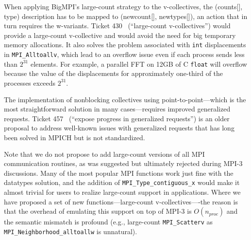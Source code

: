 When applying BigMPI's large-count strategy to the v-collectives, the (counts[], type) description 
has to be mapped to (newcount[], newtypes[]), an action that  in turn requires the w-variants.
Ticket 430~\cite{ticket430}
(``large-count v-collectives'') 
would provide a large-count v-collective and would avoid the need for big temporary memory allocations.
It also solves the problem associated with \texttt{int} displacements in \texttt{MPI\_Alltoallv}, which lead to
an overflow issue even if each process sends less than $2^{31}$ elements.
For example, a parallel FFT on 12GB of C \texttt{float} will overflow because the value of the displacements
for approximately one-third of the processes exceeds $2^{31}$.

The implementation of nonblocking collectives using
point-to-point---which is the most straightforward solution in many
cases---requires improved generalized requests.
Ticket 457~\cite{ticket457} %
(``expose progress in generalized requests'') is an older proposal to address well-known
issues with generalized requests that has long been solved in MPICH but is not standardized.


Note that we do not propose to add large-count versions of all MPI communication routines,
as was suggested but ultimately rejected during MPI-3 discussions.
Many of the most popular MPI functions work just fine with the datatypes solution, and
the addition of \texttt{MPI\_Type\_contiguous\_x} would make it almost trivial for users to
realize large-count support in applications.
Where we have proposed a set of new functions---large-count
v-collectives----the reason is that
the overhead of emulating this support on top of MPI-3 is $O(n_{proc})$ and the semantic mismatch is
profound (e.g., large-count \texttt{MPI\_Scatterv} as \texttt{MPI\_Neighborhood\_alltoallw} is unnatural).

